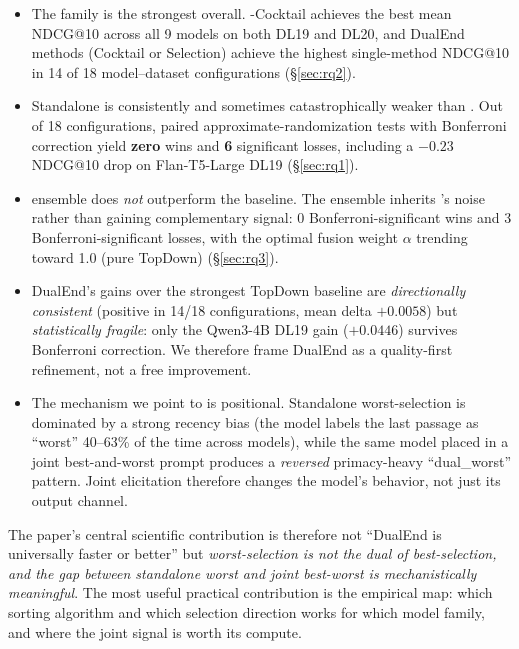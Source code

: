 \begin{itemize}[leftmargin=*]
\item The \dualend{} family is the strongest overall. \dualend{}-Cocktail achieves the best mean NDCG@10 across all 9 models on both DL19 and DL20, and DualEnd methods (Cocktail or Selection) achieve the highest single-method NDCG@10 in 14 of 18 model--dataset configurations (\S\ref{sec:rq2}).
\item Standalone \bottomup{} is consistently and sometimes catastrophically weaker than \topdown{}. Out of 18 configurations, paired approximate-randomization tests with Bonferroni correction yield \textbf{zero} \bottomup{} wins and \textbf{6} significant losses, including a $-0.23$ NDCG@10 drop on Flan-T5-Large DL19 (\S\ref{sec:rq1}).
\item \bidir{} ensemble does \emph{not} outperform the \topdown{} baseline. The ensemble inherits \bottomup{}'s noise rather than gaining complementary signal: 0 Bonferroni-significant wins and 3 Bonferroni-significant losses, with the optimal fusion weight $\alpha$ trending toward 1.0 (pure TopDown) (\S\ref{sec:rq3}).
\item DualEnd's gains over the strongest TopDown baseline are \emph{directionally consistent} (positive in 14/18 configurations, mean delta $+0.0058$) but \emph{statistically fragile}: only the Qwen3-4B DL19 gain ($+0.0446$) survives Bonferroni correction. We therefore frame DualEnd as a quality-first refinement, not a free improvement.
\item The mechanism we point to is positional. Standalone worst-selection is dominated by a strong recency bias (the model labels the last passage as ``worst'' 40--63\% of the time across models), while the same model placed in a joint best-and-worst prompt produces a \emph{reversed} primacy-heavy ``dual\_worst'' pattern. Joint elicitation therefore changes the model's behavior, not just its output channel.
\end{itemize}

The paper's central scientific contribution is therefore not ``DualEnd is universally faster or better'' but \emph{worst-selection is not the dual of best-selection, and the gap between standalone worst and joint best-worst is mechanistically meaningful}. The most useful practical contribution is the empirical map: which sorting algorithm and which selection direction works for which model family, and where the joint signal is worth its compute.


